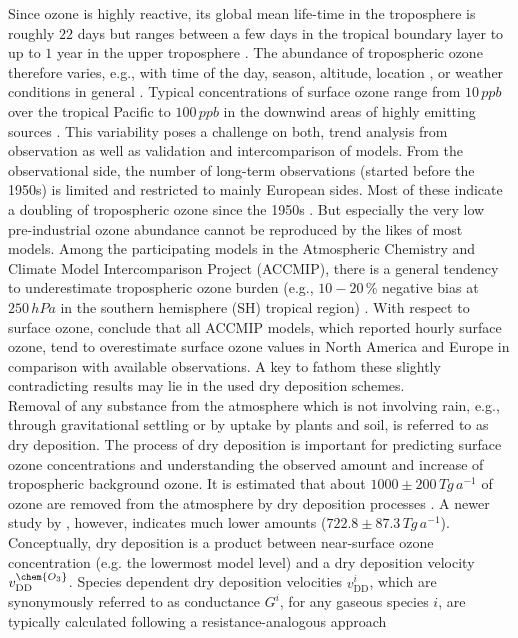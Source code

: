 \documentclass[gmd, manuscript]{copernicus}
\begin{document}
Since ozone is highly reactive, its global mean life-time in the troposphere is roughly $22$ days but ranges between a few days in the tropical boundary layer to up to $1$ year in the upper troposphere \citep{JGR:Stevenson2005,ACP:Young2013}. The abundance of tropospheric ozone therefore varies, e.g., with time of the day, season, altitude, location \citep{ACP:Schnell2015}, or weather conditions in general \citep{ACP:Otero2018}. Typical concentrations of surface ozone range from $10\,\unit{ppb}$ over the tropical Pacific to $100\,\unit{ppb}$ in the downwind areas of highly emitting sources \citep[Chapter 8]{IPCC2013}. This variability poses a challenge on both, trend analysis from observation as well as validation and intercomparison of models. From the observational side, the number of long-term observations (started before the 1950s) is limited and restricted to mainly European sides. Most of these indicate a doubling of tropospheric ozone since the 1950s \citep[Chapter 2]{IPCC2013}. But especially the very low pre-industrial ozone abundance cannot be reproduced by the likes of most models. Among the participating models in the Atmospheric Chemistry and Climate Model Intercomparison Project (ACCMIP), there is a general tendency to underestimate tropospheric ozone burden (e.g., $10-20\,\unit{\%}$ negative bias at $250\,\unit{hPa}$ in the southern hemisphere (SH) tropical region) \citep[Chapter 8]{IPCC2013}. With respect to surface ozone, \citet{ACP:Schnell2015} conclude that all ACCMIP models, which reported hourly surface ozone, tend to overestimate surface ozone values in North America and Europe in comparison with available observations. A key to fathom these slightly contradicting results may lie in the used dry deposition schemes.\\
Removal of any substance from the atmosphere which is not involving rain, e.g., through gravitational settling or by uptake by plants and soil, is referred to as dry deposition. The process of dry deposition is important for predicting surface ozone concentrations and understanding the observed amount and increase of tropospheric background ozone. It is estimated that about $1000 \pm 200\,\unit{Tg\,a^{-1}}$ of ozone are removed from the atmosphere by dry deposition processes \citep{ACP:Monks2015}. A newer study by \citet{ACP:Luhar2018}, however, indicates much lower amounts ($722.8 \pm 87.3\,\unit{Tg\,a^{-1}}$). Conceptually, dry deposition is a product between near-surface ozone concentration  (e.g. the lowermost model level) and a dry deposition velocity $v^\chem{O_3}_\text{DD}$. Species dependent dry deposition velocities $v^i_\text{DD}$, which are synonymously referred to as conductance $G^i$, for any gaseous species $i$, are typically calculated following a resistance-analogous approach
\end{document}
